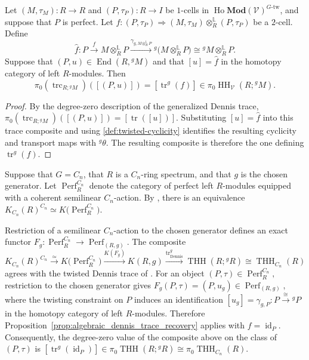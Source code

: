 \documentclass[11pt,oneside]{amsart}
\DeclareMathOperator{\Ho}{Ho}
\DeclareMathOperator{\THH}{THH}
\DeclareMathOperator{\HH}{HH}
\DeclareMathOperator{\Perf}{Perf}
\DeclareMathOperator{\End}{End}
\DeclareMathOperator{\id}{id}
\numberwithin{equation}{section}
\numberwithin{figure}{section}
\theoremstyle{plain}
\theoremstyle{definition}
\theoremstyle{remark}
\begin{document}
\begin{cor}\label{cor:generalized-twisted-trace-comparison}
Let 
\(
(M,\tau_M)\colon R\to R\) and \(
(P,\tau_P)\colon R\to I
\)
be $1$-cells in $\Ho\mathbf{Mod}(\mathcal V)^{G\text{-tw}}$, and suppose that $P$ is perfect. Let 
\(
f\colon
(P,\tau_P)
\Rightarrow
(M,\tau_M)\otimes_R^{\mathbb L}(P,\tau_P)
\)
be a $2$-cell. Define 
\[
\widehat f\colon
P
\xrightarrow{f}
M\otimes_R^{\mathbb L}P
\xrightarrow{\gamma_{g,M\otimes_R^{\mathbb L}P}}
{}^g\bigl(M\otimes_R^{\mathbb L}P\bigr)
\cong
{}^gM\otimes_R^{\mathbb L}P.
\]
Suppose that $(P,u)\in\End(R,{}^gM)$ and that 
\([u]=\widehat f
\)
in the homotopy category of left $R$-modules. Then 
\[
\pi_0(\operatorname{trc}_{R;{}^gM})([(P,u)])
= [\operatorname{tr}^g(f)]
\in
\pi_0\HH_{\mathcal V}(R;{}^gM).
\]
\end{cor}
\begin{proof}
By the degree-zero description of the generalized Dennis trace, 
\(
\pi_0(\operatorname{trc}_{R;{}^gM})([(P,u)]) = [\operatorname{tr}([u])].
\)
Substituting $[u]=\widehat f$ into this trace composite and using \eqref{def:twisted-cyclicity} identifies the resulting cyclicity and transport maps with ${}^g\theta$. The resulting composite is therefore the one defining $\operatorname{tr}^g(f)$.
\end{proof}

\begin{remark}\label{rem:connection-to-MM}
Suppose that $G=C_n$, that $R$ is a $C_n$-ring spectrum,
and that $g$ is the chosen generator. Let
$\Perf_R^{C_n}$ denote the category of perfect
left $R$-modules equipped with a coherent semilinear $C_n$-action.
By \cite[Theorem~1.3]{MM}, there is an equivalence
\(
K_{C_n}(R)^{C_n}
\simeq
K\bigl(\Perf_R^{C_n}\bigr).
\)

Restriction of a semilinear $C_n$-action to the chosen generator
defines an exact functor
\(F_g:
\Perf_R^{C_n}
\to
\Perf_{(R,g)}.
\)
The composite
\[
K_{C_n}(R)^{C_n}
\xrightarrow{\simeq}
K\bigl(\Perf_R^{C_n}\bigr)
\xrightarrow{K(F_g)}
K(R,g)
\xrightarrow{\operatorname{tr}_{\mathrm{Dennis}}^g}
\THH(R;{}^gR)
\cong
\THH_{C_n}(R)
\]
agrees with the twisted Dennis trace of
\cite[Corollary~6.2.1]{AGHKK}.
For an object
\(
(P,\tau)\in\Perf_R^{C_n},
\)
restriction to the chosen generator gives
\(
F_g(P,\tau)
=
(P,u_g)\in\Perf_{(R,g)},
\)
where the twisting constraint on \(P\) induces an identification
\(
[u_g]=\gamma_{g,P}\colon
P\xrightarrow{\cong}{}^gP
\)
in the homotopy category of left \(R\)-modules.
Therefore
Proposition~\ref{prop:algebraic_dennis_trace_recovery}
applies with \(f=\id_P\). Consequently, the degree-zero
value of the composite above on the class of \((P,\tau)\) is
\(
[\operatorname{tr}^g(\id_P)]
\in
\pi_0\THH(R;{}^gR)
\cong
\pi_0\THH_{C_n}(R).
\)
\end{remark}
\end{document}
